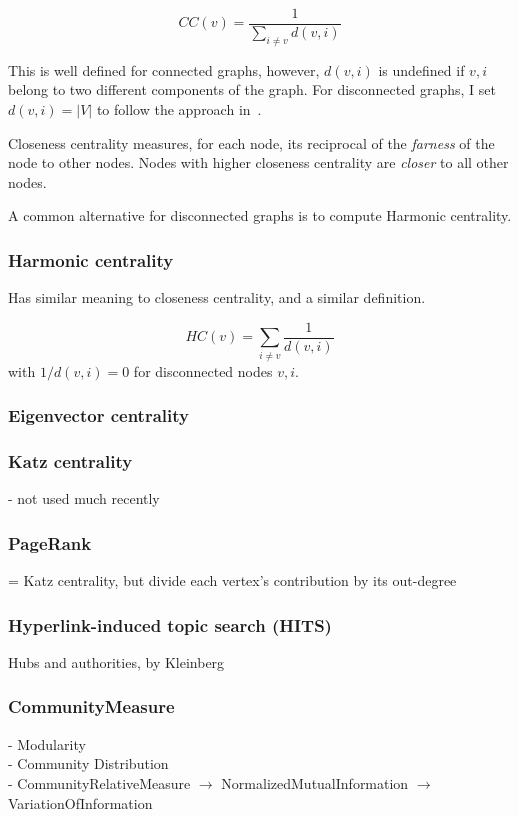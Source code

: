 \[CC(v) = \frac{1}{\sum_{i \neq v} d(v, i)}\]

This is well defined for connected graphs, however, $d(v, i)$ is undefined if $v, i$ belong to two different components of the graph. For disconnected graphs, I set $d(v, i) = |V|$ to follow the approach in~\cite{Bozhilova2019}.

Closeness centrality measures, for each node, its reciprocal of the \textsl{farness} of the node to other nodes. Nodes with higher closeness centrality are \textsl{closer} to all other nodes.

A common alternative for disconnected graphs is to compute Harmonic centrality.

\subsubsection{Harmonic centrality}

Has similar meaning to closeness centrality, and a similar definition.

\[HC(v) = \sum_{i \neq v} \frac{1}{d(v, i)}\]
with $1 / d(v, i) = 0$ for disconnected nodes $v, i$.

\subsubsection{Eigenvector centrality}

\subsubsection{Katz centrality}
- not used much recently

\subsubsection{PageRank}
= Katz centrality, but divide each vertex's contribution by its out-degree

\subsubsection{Hyperlink-induced topic search (HITS)}
Hubs and authorities, by Kleinberg


\subsubsection{CommunityMeasure}
- Modularity\\
- Community Distribution\\
- CommunityRelativeMeasure $\rightarrow$ NormalizedMutualInformation $\rightarrow$ VariationOfInformation

